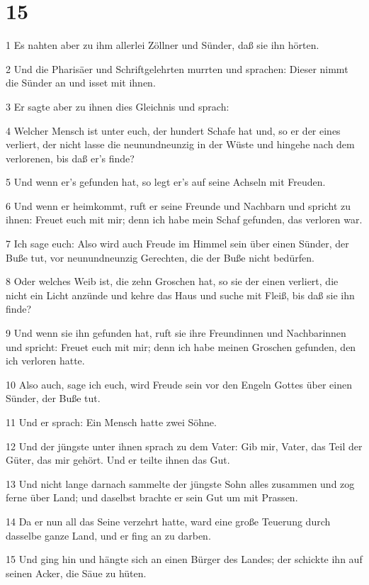\chapter{15}

\par 1 Es nahten aber zu ihm allerlei Zöllner und Sünder, daß sie ihn hörten.
\par 2 Und die Pharisäer und Schriftgelehrten murrten und sprachen: Dieser nimmt die Sünder an und isset mit ihnen.
\par 3 Er sagte aber zu ihnen dies Gleichnis und sprach:
\par 4 Welcher Mensch ist unter euch, der hundert Schafe hat und, so er der eines verliert, der nicht lasse die neunundneunzig in der Wüste und hingehe nach dem verlorenen, bis daß er's finde?
\par 5 Und wenn er's gefunden hat, so legt er's auf seine Achseln mit Freuden.
\par 6 Und wenn er heimkommt, ruft er seine Freunde und Nachbarn und spricht zu ihnen: Freuet euch mit mir; denn ich habe mein Schaf gefunden, das verloren war.
\par 7 Ich sage euch: Also wird auch Freude im Himmel sein über einen Sünder, der Buße tut, vor neunundneunzig Gerechten, die der Buße nicht bedürfen.
\par 8 Oder welches Weib ist, die zehn Groschen hat, so sie der einen verliert, die nicht ein Licht anzünde und kehre das Haus und suche mit Fleiß, bis daß sie ihn finde?
\par 9 Und wenn sie ihn gefunden hat, ruft sie ihre Freundinnen und Nachbarinnen und spricht: Freuet euch mit mir; denn ich habe meinen Groschen gefunden, den ich verloren hatte.
\par 10 Also auch, sage ich euch, wird Freude sein vor den Engeln Gottes über einen Sünder, der Buße tut.
\par 11 Und er sprach: Ein Mensch hatte zwei Söhne.
\par 12 Und der jüngste unter ihnen sprach zu dem Vater: Gib mir, Vater, das Teil der Güter, das mir gehört. Und er teilte ihnen das Gut.
\par 13 Und nicht lange darnach sammelte der jüngste Sohn alles zusammen und zog ferne über Land; und daselbst brachte er sein Gut um mit Prassen.
\par 14 Da er nun all das Seine verzehrt hatte, ward eine große Teuerung durch dasselbe ganze Land, und er fing an zu darben.
\par 15 Und ging hin und hängte sich an einen Bürger des Landes; der schickte ihn auf seinen Acker, die Säue zu hüten.
